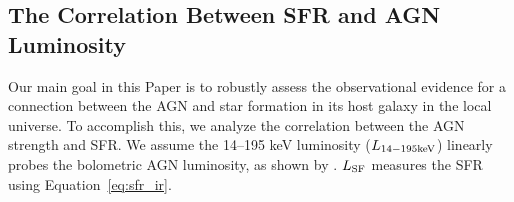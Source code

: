 \documentclass[fleqn, usenatbib]{mnras}
\begin{document}
%
%
%
 
\subsection{The Correlation Between SFR and AGN Luminosity}
Our main goal in this Paper is to robustly assess the observational evidence for a connection between the AGN and star formation in its host galaxy in the local universe. To accomplish this, we analyze the correlation between the AGN strength and SFR. We assume the 14--195 keV luminosity ($L_{\rm 14-195 keV}$) linearly probes the bolometric AGN luminosity, as shown by \citet{Winter:2012yq}. $L_{\rm SF}$ measures the SFR using Equation~\ref{eq:sfr_ir}.
\end{document}
